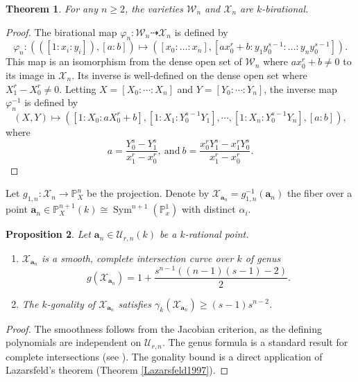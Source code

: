 \documentclass[11pt, a4paper]{amsart}
\newtheorem{thm}{Theorem}[section]
\newtheorem{prop}[thm]{Proposition}
\theoremstyle{definition}
\newcommand{\Pp}{\mathbb{P}}
\newcommand{\Uc}{\mathcal{U}}
\newcommand{\Wc}{\mathcal{W}}
\newcommand{\Xc}{\mathcal{X}}
\newcommand{\ba}{\mathbf{a}}
\DeclareMathOperator{\Sym}{Sym}
\begin{document}
\begin{thm}
	\label{thm2}
	For any $n \geq 2$, the varieties $\Wc_n$ and $\Xc_n$ are $k$-birational.
\end{thm}
\begin{proof}
	The birational map $\varphi_n: \Wc_n \dashrightarrow \Xc_n$ is defined by
	\[ \varphi_n: (([1:x_i:y_i]), [a:b]) \mapsto ([x_0:\dots:x_n], [ax_0^r+b : y_1 y_0^{s-1} : \dots : y_n y_0^{s-1}]). \]
	This map is an isomorphism from the dense open set of $\Wc_n$ where $ax_0^r+b \neq 0$ to its image in $\Xc_n$. Its inverse is well-defined on the dense open set where $X_1^r - X_0^r \neq 0$.
	Letting $X= [ X_0: \cdots: X_n]$ and $Y=[ Y_0 : 
	\cdots : Y_n]$, the inverse map $\varphi_n^{-1}$  is defined by
	$$ \left( X, Y \right) \mapsto 
	\left(  [1:X_0: a X_0^r+b], [1: X_1: Y_0^{s-1} Y_1], \cdots, [1: X_n: Y_0^{s-1} Y_n], [ a: b ]\right),$$ 
	where  
	\begin{equation*} 
		a=\frac {Y_0^s-Y_1^s}{x_1^r-x_0^r}, \  \text{and} \ b= \frac {x_0^r Y_1^s -x_1^r Y_0^s}{x_1^r-x_0^r}.
	\end{equation*}
	
\end{proof}

Let $g_{1,n}: \Xc_n \to \Pp^n_X$ be the projection. Denote by $\Xc_{\ba_n} = g_{1,n}^{-1}(\ba_n)$ the fiber
over a point $\ba_n  \in \Pp^{n+1}_X(k) \cong \Sym^{n+1}(\Pp^1_x)$ with distinct $\alpha_i$.

\begin{prop}
	\label{p1}
	Let $\ba_n \in \Uc_{r,n}(k)$ be a $k$-rational point.
	\begin{enumerate}
		\item $\Xc_{\ba_n}$ is a smooth, complete intersection curve over $k$ of genus
		\[ g(\Xc_{\ba_n}) = 1 + \frac{s^{n-1}((n-1)(s-1)-2)}{2}. \]
		\item The $k$-gonality of $\Xc_{\ba_n}$ satisfies $\gamma_k(\Xc_{\ba_n}) \geq (s-1)s^{n-2}$.
	\end{enumerate}
\end{prop}
\begin{proof}
	The smoothness follows from the Jacobian criterion, as the defining polynomials are independent on $\Uc_{r,n}$. The genus formula is a standard result for complete intersections (see \cite[Ex. II.8.4]{Ha}). The gonality bound is a direct application of Lazarsfeld's theorem (Theorem \ref{Lazarsfeld1997}).
\end{proof}
\end{document}
